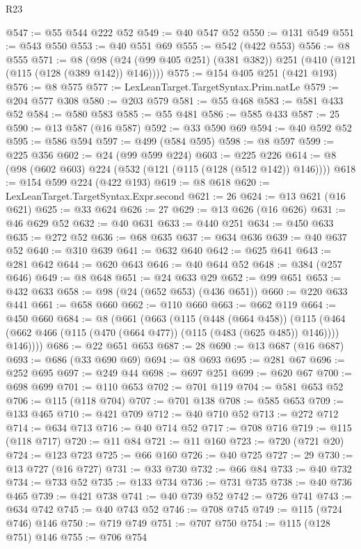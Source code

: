 \begin{lexlean}{R23}
\begin{coremodule}
@547 := @55 @544 @222 @52
@549 := @40 @547 @52
@550 := @131 @549
@551 := @543 @550
@553 := @40 @551 @69
@555 := @542 (@422 @553)
@556 := @8 @555
@571 := @8 (@98 (@24 (@99 @405 @251) (@381 @382)) @251 (@410 (@121 (@115 (@128 (@389 @142)) @146))))
@575 := @154 @405 @251 (@421 @193)
@576 := @8 @575
@577 := LexLeanTarget.TargetSyntax.Prim.natLe
@579 := @204 @577 @308
@580 := @203 @579
@581 := @55 @468
@583 := @581 @433 @52
@584 := @580 @583
@585 := @55 @481
@586 := @585 @433
@587 := 25
@590 := @13 @587 (@16 @587)
@592 := @33 @590 @69
@594 := @40 @592 @52
@595 := @586 @594
@597 := @499 (@584 @595)
@598 := @8 @597
@599 := @225 @356
@602 := @24 (@99 @599 @224)
@603 := @225 @226
@614 := @8 (@98 (@602 @603) @224 (@532 (@121 (@115 (@128 (@512 @142)) @146))))
@618 := @154 @599 @224 (@422 @193)
@619 := @8 @618
@620 := LexLeanTarget.TargetSyntax.Expr.second
@621 := 26
@624 := @13 @621 (@16 @621)
@625 := @33 @624
@626 := 27
@629 := @13 @626 (@16 @626)
@631 := @46 @629 @52
@632 := @40 @631
@633 := @440 @251
@634 := @450 @633
@635 := @272 @52
@636 := @68 @635
@637 := @634 @636
@639 := @40 @637 @52
@640 := @310 @639
@641 := @632 @640
@642 := @625 @641
@643 := @281 @642
@644 := @620 @643
@646 := @40 @644 @52
@648 := @384 (@257 @646)
@649 := @8 @648
@651 := @24 @633 @29
@652 := @99 @651
@653 := @432 @633
@658 := @98 (@24 (@652 @653) (@436 @651))
@660 := @220 @633 @441
@661 := @658 @660
@662 := @110 @660
@663 := @662 @119
@664 := @450 @660
@684 := @8
    (@661
      (@663
        (@115
          (@448 (@664 @458))
          (@115 (@464 (@662 @466 (@115 (@470 (@664 @477)) (@115 (@483 (@625 @485)) @146)))) @146))))
@686 := @22 @651 @653
@687 := 28
@690 := @13 @687 (@16 @687)
@693 := @686 (@33 @690 @69)
@694 := @8 @693
@695 := @281 @67
@696 := @252 @695
@697 := @249 @44
@698 := @697 @251
@699 := @620 @67
@700 := @698 @699
@701 := @110 @653
@702 := @701 @119
@704 := @581 @653 @52
@706 := @115 (@118 @704)
@707 := @701 @138
@708 := @585 @653
@709 := @133 @465
@710 := @421 @709
@712 := @40 @710 @52
@713 := @272 @712
@714 := @634 @713
@716 := @40 @714 @52
@717 := @708 @716
@719 := @115 (@118 @717)
@720 := @11 @84
@721 := @11 @160
@723 := @720 (@721 @20)
@724 := @123 @723
@725 := @66 @160
@726 := @40 @725
@727 := 29
@730 := @13 @727 (@16 @727)
@731 := @33 @730
@732 := @66 @84
@733 := @40 @732
@734 := @733 @52
@735 := @133 @734
@736 := @731 @735
@738 := @40 @736 @465
@739 := @421 @738
@741 := @40 @739 @52
@742 := @726 @741
@743 := @634 @742
@745 := @40 @743 @52
@746 := @708 @745
@749 := @115 (@724 @746) @146
@750 := @719 @749
@751 := @707 @750
@754 := @115 (@128 @751) @146
@755 := @706 @754

\end{coremodule}
\end{lexlean}
